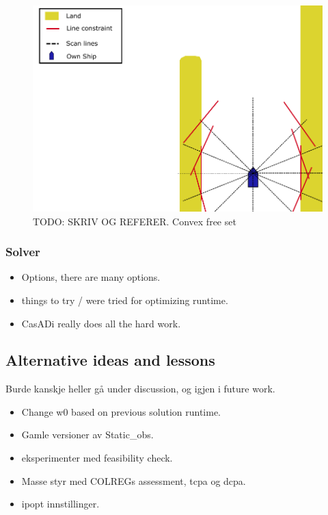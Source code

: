 \begin{figure}
    \centering
    \label{FIG: Static Obs Lines}
    \includegraphics[width=\textwidth]{Images/StaticObs_lines.pdf}
    \caption{TODO: SKRIV OG REFERER. Convex free set}
\end{figure}

\subsubsection{Solver}
\begin{itemize}
    \item Options, there are many options.
    \item things to try / were tried for optimizing runtime.
    \item CasADi really does all the hard work.
\end{itemize}

\subsection{Alternative ideas and lessons}
Burde kanskje heller gå under discussion, og igjen i future work.
\begin{itemize}
    \item Change w0 based on previous solution runtime.
    \item Gamle versioner av Static\_obs.
    \item eksperimenter med feasibility check.
    \item Masse styr med COLREGs assessment, tcpa og dcpa.
    \item ipopt innstillinger.
\end{itemize}
\newpage